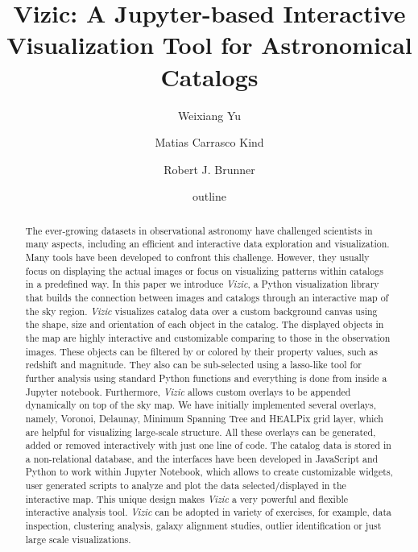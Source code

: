 \documentclass[5p,authoryear]{elsarticle}
\begin{document}
\title{Vizic: A Jupyter-based Interactive Visualization Tool for Astronomical Catalogs
}

\author[phy,ncsa]{Weixiang Yu }
\author[ncsa,astro]{Matias Carrasco Kind}
\author[astro,ncsa]{Robert J. Brunner}
\address[phy]{Department of Physics, University of Illinois at Urbana-Champaign, Urbana IL, USA}
\address[ncsa]{National Center for Supercomputing Applications, University of Illinois at Urbana-Champaign, Urbana IL, USA}
\address[astro]{Department of Astronomy, University of Illinois at Urbana-Champaign, Urbana IL, USA}
\date{outline}

\begin{abstract}
The ever-growing datasets in observational astronomy have challenged scientists in many aspects, including an efficient and interactive data exploration and visualization.
Many tools have been developed to confront this challenge. However, they usually focus on displaying the actual images or focus on visualizing patterns within catalogs in a predefined way.
In this paper we introduce \textit{Vizic}, a Python visualization library that builds the connection between images and catalogs through an interactive map of the sky region.
\textit{Vizic} visualizes catalog data over a custom background canvas using the shape, size and orientation of each object in the catalog.
The displayed objects in the map are highly interactive and customizable comparing to those in the observation images.
These objects can be filtered by or colored by their property values, such as redshift and magnitude. They also can be sub-selected using a lasso-like tool for further analysis using standard Python functions and everything is done from inside a Jupyter notebook. Furthermore, \textit{Vizic} allows custom overlays to be appended dynamically on top of the sky map.
We have initially implemented several overlays, namely, Voronoi, Delaunay, Minimum Spanning Tree and HEALPix grid layer, which are helpful for visualizing large-scale structure. All these overlays can be generated, added or removed interactively with just one line of code.
The catalog data is stored in a non-relational database, and the interfaces have been developed in JavaScript and Python to work within Jupyter Notebook, which allows to create customizable widgets, user generated scripts to analyze and plot the data selected/displayed in the interactive map. This unique design makes \textit{Vizic} a very powerful and flexible interactive analysis tool.
\textit{Vizic} can be adopted in variety of exercises, for example, data inspection, clustering analysis, galaxy alignment studies, outlier identification or just large scale visualizations.
\end{abstract}
\end{document}
